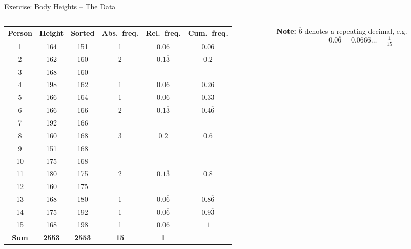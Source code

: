 \documentclass[aspectratio=169,11pt]{beamer}
\begin{document}
\begin{frame}{Exercise: Body Heights -- The Data}
  \begin{columns}[c]
  \begin{column}{0.66\textwidth}
  \centering
    \renewcommand{\arraystretch}{0.9}
    \footnotesize
    \begin{tabular}{cccccc}
      \toprule
      \textbf{Person} & \textbf{Height} & \textbf{Sorted} & \textbf{Abs.\ freq.} & \textbf{Rel.\ freq.} & \textbf{Cum.\ freq.} \\
      \midrule
      1  & 164 & 151 & 1 & $0.0\overline{6}$ & $0.0\overline{6}$ \\
      2  & 162 & 160 & 2 & $0.1\overline{3}$ & $0.2$ \\
      3  & 168 & 160 &   &   &   \\
      4  & 198 & 162 & 1 & $0.0\overline{6}$ & $0.2\overline{6}$ \\
      5  & 166 & 164 & 1 & $0.0\overline{6}$ & $0.3\overline{3}$ \\
      6  & 166 & 166 & 2 & $0.1\overline{3}$ & $0.4\overline{6}$ \\
      7  & 192 & 166 &   &   &   \\
      8  & 160 & 168 & 3 & $0.2$ & $0.\overline{6}$ \\
      9  & 151 & 168 &   &   &   \\
      10 & 175 & 168 &   &   &   \\
      11 & 180 & 175 & 2 & $0.1\overline{3}$ & $0.8$ \\
      12 & 160 & 175 &   &   &   \\
      13 & 168 & 180 & 1 & $0.0\overline{6}$ & $0.8\overline{6}$ \\
      14 & 175 & 192 & 1 & $0.0\overline{6}$ & $0.9\overline{3}$ \\
      15 & 168 & 198 & 1 & $0.0\overline{6}$ & $1$ \\
      \midrule
      \textbf{Sum} & \textbf{2553} & \textbf{2553} & \textbf{15} & \textbf{1} & \\
      \bottomrule
    \end{tabular}
  \end{column}
  \begin{column}{0.3\textwidth}
    \footnotesize
    \textbf{Note:} $\overline{6}$ denotes a repeating decimal, e.g.\
    \[ 0.0\overline{6} = 0.0666\ldots = \tfrac{1}{15} \]
  \end{column}
  \end{columns}
\end{frame}
\end{document}
